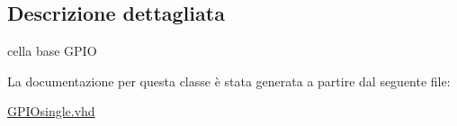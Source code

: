 \subsection{Descrizione dettagliata}
cella base G\+P\+I\+O 

La documentazione per questa classe è stata generata a partire dal seguente file\+:\begin{DoxyCompactItemize}
\item 
\hyperlink{_g_p_i_osingle_8vhd}{G\+P\+I\+Osingle.\+vhd}\end{DoxyCompactItemize}
